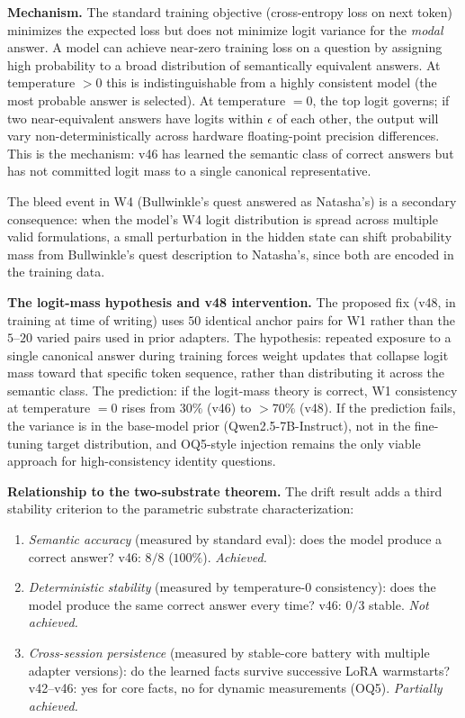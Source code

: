 \documentclass[11pt]{article}
\begin{document}
\textbf{Mechanism.} The standard training objective (cross-entropy loss on next token) minimizes
the expected loss but does not minimize logit variance for the \emph{modal} answer. A model can
achieve near-zero training loss on a question by assigning high probability to a broad
distribution of semantically equivalent answers. At temperature $> 0$ this is indistinguishable
from a highly consistent model (the most probable answer is selected). At temperature $= 0$,
the top logit governs; if two near-equivalent answers have logits within $\epsilon$ of each
other, the output will vary non-deterministically across hardware floating-point precision
differences. This is the mechanism: v46 has learned the semantic class of correct answers but
has not committed logit mass to a single canonical representative.

The bleed event in W4 (Bullwinkle's quest answered as Natasha's) is a secondary consequence:
when the model's W4 logit distribution is spread across multiple valid formulations, a small
perturbation in the hidden state can shift probability mass from Bullwinkle's quest description
to Natasha's, since both are encoded in the training data.

\textbf{The logit-mass hypothesis and v48 intervention.} The proposed fix (v48, in training at
time of writing) uses $50$ identical anchor pairs for W1 rather than the $5$--$20$ varied pairs
used in prior adapters. The hypothesis: repeated exposure to a single canonical answer during
training forces weight updates that collapse logit mass toward that specific token sequence,
rather than distributing it across the semantic class. The prediction: if the logit-mass theory
is correct, W1 consistency at temperature $= 0$ rises from $30\%$ (v46) to $>70\%$ (v48).
If the prediction fails, the variance is in the base-model prior (Qwen2.5-7B-Instruct), not in
the fine-tuning target distribution, and OQ5-style injection remains the only viable approach
for high-consistency identity questions.

\textbf{Relationship to the two-substrate theorem.} The drift result adds a third stability
criterion to the parametric substrate characterization:

\begin{enumerate}
  \item \emph{Semantic accuracy} (measured by standard eval): does the model produce a correct answer? v46: $8/8$ ($100\%$). \emph{Achieved.}
  \item \emph{Deterministic stability} (measured by temperature-$0$ consistency): does the model produce the same correct answer every time? v46: $0/3$ stable. \emph{Not achieved.}
  \item \emph{Cross-session persistence} (measured by stable-core battery with multiple adapter versions): do the learned facts survive successive LoRA warmstarts? v42--v46: yes for core facts, no for dynamic measurements (OQ5). \emph{Partially achieved.}
\end{enumerate}
\end{document}

